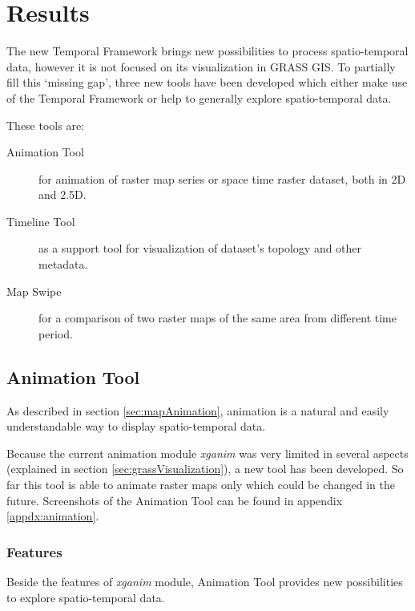 \documentclass[a4paper,12pt,oneside]{book}
\newcommand{\module}[1]{\textsl{#1}}
\newcommand{\tf}{Temporal Framework\xspace}
\newcommand{\at}{Animation Tool\xspace}
\newcommand{\ms}{Map Swipe\xspace}
\begin{document}



\chapter{Results}%
\label{chap:results}
The new \tf brings new possibilities to process spatio-temporal data,
however it is not focused on its visualization in GRASS GIS. To partially fill this `missing gap',
three new tools have been developed which either make use of the \tf
or help to generally explore spatio-temporal data.

\noindent These tools are:
\begin{description}
    \item[\at]for animation of raster map series or space time raster dataset, both in 2D and 2.5D.
    \item[Timeline Tool] as a support tool for visualization of dataset's topology and other metadata.
    \item[\ms]for a comparison of two raster maps of the same area from different time period.
\end{description}

\section{\at}
\label{sec:animationTool}
As described in section \ref{sec:mapAnimation},
animation is a natural and easily understandable way to display spatio-temporal data.

Because the current animation module \module{xganim} was very limited
in several aspects (explained in section \ref{sec:grassVisualization}),
a new tool has been developed. So far this tool is able to animate raster maps
only which could be changed in the future.
Screenshots of the \at can be found in appendix \ref{appdx:animation}.

\subsection{Features}
Beside the features of \module{xganim} module, \at provides new possibilities
to explore spatio-temporal data.
\end{document}

